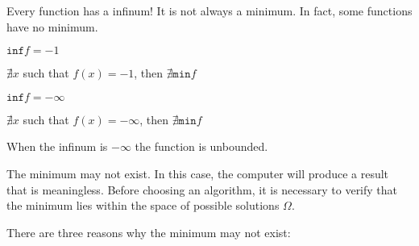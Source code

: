 Every function has a infinum! It is not always a minimum. In fact, some functions have no minimum.

\begin{minipage}{0.5\textwidth}
    \begin{center}
        \( \mathtt{inf} f = -1 \)

        \( \nexists x \) such that \( f(x) = -1 \), then \( \nexists \mathtt{min} f \)
    \end{center}
\end{minipage}
\begin{minipage}{0.5\textwidth}

    \begin{center}
        \( \mathtt{inf} f = -\infty \)

        \( \nexists x \) such that \( f(x) = -\infty \), then \( \nexists \mathtt{min} f \)
    \end{center}
\end{minipage}

When the infinum is \( -\infty \) the function is unbounded.

The minimum may not exist. In this case, the computer will produce a result that is meaningless. Before choosing an algorithm, it is necessary to verify that the minimum lies within the space of possible solutions \( \Omega \).

There are three reasons why the minimum may not exist:

